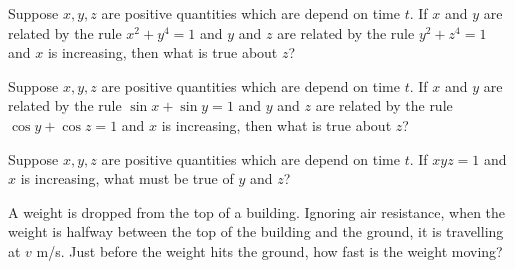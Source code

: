 \documentclass{ximera}
\newcommand{\recommendation}[1]{}
\begin{document}
\begin{shuffle}


\begin{problem}
  Suppose $x, y, z$ are positive quantities which are depend on time
  $t$.  If $x$ and $y$ are related by the rule $x^2 + y^4 = 1$ and $y$
  and $z$ are related by the rule $y^2 + z^4 = 1$ and $x$ is
  increasing, then what is true about $z$?
  \begin{multipleChoice}
  \end{multipleChoice}
\end{problem}

\begin{problem}
  Suppose $x, y, z$ are positive quantities which are depend on time
  $t$.  If $x$ and $y$ are related by the rule $\sin x + \sin y = 1$ and $y$
  and $z$ are related by the rule $\cos y + \cos z = 1$ and $x$ is
  increasing, then what is true about $z$?
  \begin{multipleChoice}
  \end{multipleChoice}
\end{problem}

\begin{problem}
  Suppose $x, y, z$ are positive quantities which are depend on time
  $t$.  If $xyz = 1$ and $x$ is increasing, what must be true of $y$ and $z$?
  \begin{multipleChoice}
  \end{multipleChoice}
\end{problem}



\begin{problem}
  A weight is dropped from the top of a building.  Ignoring air
  resistance, when the weight is halfway between the top of the
  building and the ground, it is travelling at $v$ m/s.  Just before
  the weight hits the ground, how fast is the weight moving?
  \begin{multipleChoice}
  \end{multipleChoice}
\end{problem}


\end{shuffle}
\end{document}
